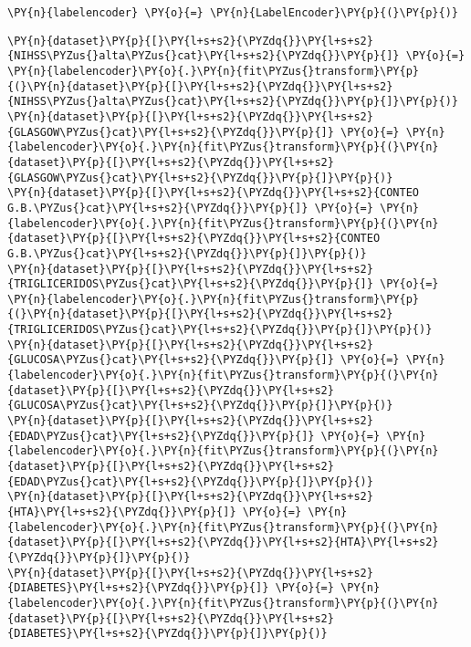     \begin{tcolorbox}[breakable, size=fbox, boxrule=1pt, pad at break*=1mm,colback=cellbackground, colframe=cellborder]
\begin{Verbatim}[commandchars=\\\{\}]
\PY{n}{labelencoder} \PY{o}{=} \PY{n}{LabelEncoder}\PY{p}{(}\PY{p}{)}
\end{Verbatim}
\end{tcolorbox}

    \begin{tcolorbox}[breakable, size=fbox, boxrule=1pt, pad at break*=1mm,colback=cellbackground, colframe=cellborder]
\begin{Verbatim}[commandchars=\\\{\}]
\PY{n}{dataset}\PY{p}{[}\PY{l+s+s2}{\PYZdq{}}\PY{l+s+s2}{NIHSS\PYZus{}alta\PYZus{}cat}\PY{l+s+s2}{\PYZdq{}}\PY{p}{]} \PY{o}{=} \PY{n}{labelencoder}\PY{o}{.}\PY{n}{fit\PYZus{}transform}\PY{p}{(}\PY{n}{dataset}\PY{p}{[}\PY{l+s+s2}{\PYZdq{}}\PY{l+s+s2}{NIHSS\PYZus{}alta\PYZus{}cat}\PY{l+s+s2}{\PYZdq{}}\PY{p}{]}\PY{p}{)}
\PY{n}{dataset}\PY{p}{[}\PY{l+s+s2}{\PYZdq{}}\PY{l+s+s2}{GLASGOW\PYZus{}cat}\PY{l+s+s2}{\PYZdq{}}\PY{p}{]} \PY{o}{=} \PY{n}{labelencoder}\PY{o}{.}\PY{n}{fit\PYZus{}transform}\PY{p}{(}\PY{n}{dataset}\PY{p}{[}\PY{l+s+s2}{\PYZdq{}}\PY{l+s+s2}{GLASGOW\PYZus{}cat}\PY{l+s+s2}{\PYZdq{}}\PY{p}{]}\PY{p}{)}
\PY{n}{dataset}\PY{p}{[}\PY{l+s+s2}{\PYZdq{}}\PY{l+s+s2}{CONTEO G.B.\PYZus{}cat}\PY{l+s+s2}{\PYZdq{}}\PY{p}{]} \PY{o}{=} \PY{n}{labelencoder}\PY{o}{.}\PY{n}{fit\PYZus{}transform}\PY{p}{(}\PY{n}{dataset}\PY{p}{[}\PY{l+s+s2}{\PYZdq{}}\PY{l+s+s2}{CONTEO G.B.\PYZus{}cat}\PY{l+s+s2}{\PYZdq{}}\PY{p}{]}\PY{p}{)}
\PY{n}{dataset}\PY{p}{[}\PY{l+s+s2}{\PYZdq{}}\PY{l+s+s2}{TRIGLICERIDOS\PYZus{}cat}\PY{l+s+s2}{\PYZdq{}}\PY{p}{]} \PY{o}{=} \PY{n}{labelencoder}\PY{o}{.}\PY{n}{fit\PYZus{}transform}\PY{p}{(}\PY{n}{dataset}\PY{p}{[}\PY{l+s+s2}{\PYZdq{}}\PY{l+s+s2}{TRIGLICERIDOS\PYZus{}cat}\PY{l+s+s2}{\PYZdq{}}\PY{p}{]}\PY{p}{)}
\PY{n}{dataset}\PY{p}{[}\PY{l+s+s2}{\PYZdq{}}\PY{l+s+s2}{GLUCOSA\PYZus{}cat}\PY{l+s+s2}{\PYZdq{}}\PY{p}{]} \PY{o}{=} \PY{n}{labelencoder}\PY{o}{.}\PY{n}{fit\PYZus{}transform}\PY{p}{(}\PY{n}{dataset}\PY{p}{[}\PY{l+s+s2}{\PYZdq{}}\PY{l+s+s2}{GLUCOSA\PYZus{}cat}\PY{l+s+s2}{\PYZdq{}}\PY{p}{]}\PY{p}{)}
\PY{n}{dataset}\PY{p}{[}\PY{l+s+s2}{\PYZdq{}}\PY{l+s+s2}{EDAD\PYZus{}cat}\PY{l+s+s2}{\PYZdq{}}\PY{p}{]} \PY{o}{=} \PY{n}{labelencoder}\PY{o}{.}\PY{n}{fit\PYZus{}transform}\PY{p}{(}\PY{n}{dataset}\PY{p}{[}\PY{l+s+s2}{\PYZdq{}}\PY{l+s+s2}{EDAD\PYZus{}cat}\PY{l+s+s2}{\PYZdq{}}\PY{p}{]}\PY{p}{)}
\PY{n}{dataset}\PY{p}{[}\PY{l+s+s2}{\PYZdq{}}\PY{l+s+s2}{HTA}\PY{l+s+s2}{\PYZdq{}}\PY{p}{]} \PY{o}{=} \PY{n}{labelencoder}\PY{o}{.}\PY{n}{fit\PYZus{}transform}\PY{p}{(}\PY{n}{dataset}\PY{p}{[}\PY{l+s+s2}{\PYZdq{}}\PY{l+s+s2}{HTA}\PY{l+s+s2}{\PYZdq{}}\PY{p}{]}\PY{p}{)}
\PY{n}{dataset}\PY{p}{[}\PY{l+s+s2}{\PYZdq{}}\PY{l+s+s2}{DIABETES}\PY{l+s+s2}{\PYZdq{}}\PY{p}{]} \PY{o}{=} \PY{n}{labelencoder}\PY{o}{.}\PY{n}{fit\PYZus{}transform}\PY{p}{(}\PY{n}{dataset}\PY{p}{[}\PY{l+s+s2}{\PYZdq{}}\PY{l+s+s2}{DIABETES}\PY{l+s+s2}{\PYZdq{}}\PY{p}{]}\PY{p}{)}


\end{Verbatim}
\end{tcolorbox}
